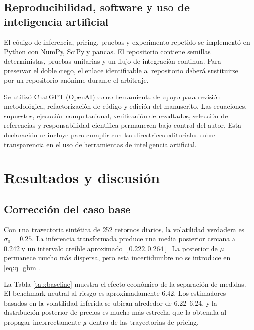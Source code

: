 \documentclass[12pt,letterpaper]{article}
\begin{document}
\subsection{Reproducibilidad, software y uso de inteligencia artificial}

El código de inferencia, pricing, pruebas y experimento repetido se implementó en Python con NumPy, SciPy y pandas. El repositorio contiene semillas deterministas, pruebas unitarias y un flujo de integración continua. Para preservar el doble ciego, el enlace identificable al repositorio deberá sustituirse por un repositorio anónimo durante el arbitraje.

Se utilizó ChatGPT (OpenAI) como herramienta de apoyo para revisión metodológica, refactorización de código y edición del manuscrito. Las ecuaciones, supuestos, ejecución computacional, verificación de resultados, selección de referencias y responsabilidad científica permanecen bajo control del autor. Esta declaración se incluye para cumplir con las directrices editoriales sobre transparencia en el uso de herramientas de inteligencia artificial.

\section{Resultados y discusión}

\subsection{Corrección del caso base}

Con una trayectoria sintética de 252 retornos diarios, la volatilidad verdadera es $\sigma_0=0.25$. La inferencia transformada produce una media posterior cercana a 0.242 y un intervalo creíble aproximado $[0.222,0.264]$. La posterior de $\mu$ permanece mucho más dispersa, pero esta incertidumbre no se introduce en \eqref{eq:q_gbm}.

La Tabla \ref{tab:baseline} muestra el efecto económico de la separación de medidas. El benchmark neutral al riesgo es aproximadamente 6.42. Los estimadores basados en la volatilidad inferida se ubican alrededor de 6.22--6.24, y la distribución posterior de precios es mucho más estrecha que la obtenida al propagar incorrectamente $\mu$ dentro de las trayectorias de pricing.
\end{document}

